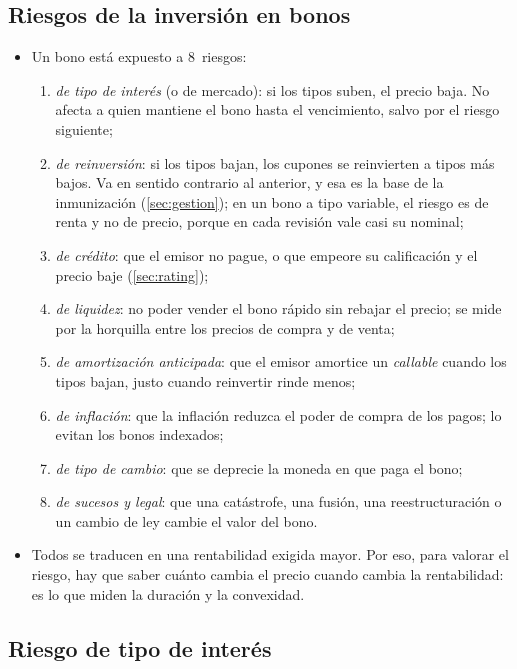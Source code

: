 \documentclass[11pt]{article}
\begin{document}
\subsection{Riesgos de la inversión en bonos}\label{sec:riesgos}

\begin{itemize}
\item Un bono está expuesto a 8~riesgos\nocite{BodieKaneMarcus2021Investments}:
  \begin{enumerate}
  \item \emph{de tipo de interés} (o de mercado): si los tipos suben, el precio baja. No afecta a quien mantiene el bono hasta el vencimiento, salvo por el riesgo siguiente;
  \item \emph{de reinversión}: si los tipos bajan, los cupones se reinvierten a tipos más bajos. Va en sentido contrario al anterior, y esa es la base de la inmunización (\ref{sec:gestion}); en un bono a tipo variable, el riesgo es de renta y no de precio, porque en cada revisión vale casi su nominal;
  \item \emph{de crédito}: que el emisor no pague, o que empeore su calificación y el precio baje (\ref{sec:rating});
  \item \emph{de liquidez}: no poder vender el bono rápido sin rebajar el precio; se mide por la horquilla entre los precios de compra y de venta;
  \item \emph{de amortización anticipada}: que el emisor amortice un \emph{callable} cuando los tipos bajan, justo cuando reinvertir rinde menos;
  \item \emph{de inflación}: que la inflación reduzca el poder de compra de los pagos; lo evitan los bonos indexados;
  \item \emph{de tipo de cambio}: que se deprecie la moneda en que paga el bono;
  \item \emph{de sucesos y legal}: que una catástrofe, una fusión, una reestructuración o un cambio de ley cambie el valor del bono.
  \end{enumerate}
\item Todos se traducen en una rentabilidad exigida mayor. Por eso, para valorar el riesgo, hay que saber cuánto cambia el precio cuando cambia la rentabilidad: es lo que miden la duración y la convexidad.
\end{itemize}

\subsection{Riesgo de tipo de interés}\label{sec:riesgo-tipo}
\end{document}
